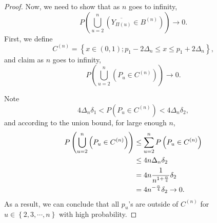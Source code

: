 \begin{proof}
Now, we need to show that as $n$ goes to infinity,
\[P\left( \bigcup\limits_{u=2}^{n} \left(\overline{Y_{\Pi(u)}}\in B^{(n)}\right)\right) \rightarrow 0.\]
First, we define
\[
C^{(n)}=\left\{x\in (0,1); p_1-2\Delta_n \leq x \leq p_1+2\Delta_n\right\}
,\]
and claim as $n$ goes to infinity,
\[P\left(\bigcup\limits_{u=2}^n \left(P_u \in C^{(n)}\right) \right)\rightarrow 0. \]

Note
\[4\Delta_n\delta_1< P\left( P_u\in C^{(n)}\right) < 4 \Delta_n\delta_2,\]
and according to the union bound, for large enough $n$,
\begin{align}
\nonumber P\left( \bigcup\limits_{u=2}^n \left(P_u \in C^{(n)}\right) \right) &\leq \sum\limits_{u=2}^n P\left( P_u \in C^{(n)}\right) \\
\nonumber &\leq 4n \Delta_n \delta_2\\
\nonumber &= 4n \frac{1}{n^{1+{\frac{\alpha}{4}}}} \delta_2\\
\nonumber &= 4n^{-\frac{\alpha}{4}}\delta_2 \rightarrow 0. \ \
\end{align}
As a result, we can conclude that all $p_u$'s are outside of $C^{(n)}$ for $u \in \left\{2,3, \cdots, n\right\}$ with high probability.


\end{proof}
